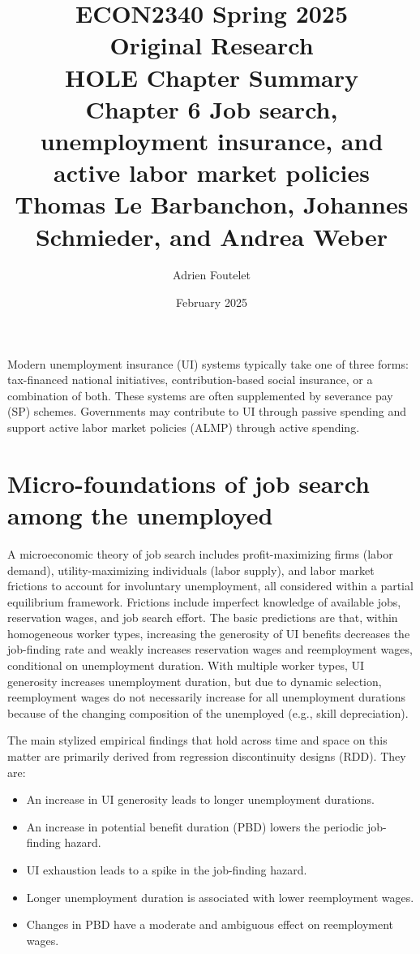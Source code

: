 \documentclass{article}
\title{ECON2340 Spring 2025\\Original Research\\HOLE Chapter Summary\\Chapter 6 Job search, unemployment insurance, and active labor market policies\\Thomas Le Barbanchon, Johannes Schmieder, and Andrea Weber}
\author{Adrien Foutelet}
\date{February 2025}
\begin{document}
\maketitle

Modern unemployment insurance (UI) systems typically take one of three forms: tax-financed national initiatives, contribution-based social insurance, or a combination of both. These systems are often supplemented by severance pay (SP) schemes. Governments may contribute to UI through passive spending and support active labor market policies (ALMP) through active spending.

\section{Micro-foundations of job search among the unemployed}

A microeconomic theory of job search includes profit-maximizing firms (labor demand), utility-maximizing individuals (labor supply), and labor market frictions to account for involuntary unemployment, all considered within a partial equilibrium framework. Frictions include imperfect knowledge of available jobs, reservation wages, and job search effort. The basic predictions are that, within homogeneous worker types, increasing the generosity of UI benefits decreases the job-finding rate and weakly increases reservation wages and reemployment wages, conditional on unemployment duration. With multiple worker types, UI generosity increases unemployment duration, but due to dynamic selection, reemployment wages do not necessarily increase for all unemployment durations because of the changing composition of the unemployed (e.g., skill depreciation).

The main stylized empirical findings that hold across time and space on this matter are primarily derived from regression discontinuity designs (RDD). They are:

\begin{itemize}
    \item An increase in UI generosity leads to longer unemployment durations.
    \item An increase in potential benefit duration (PBD) lowers the periodic job-finding hazard.
    \item UI exhaustion leads to a spike in the job-finding hazard.
    \item Longer unemployment duration is associated with lower reemployment wages.
    \item Changes in PBD have a moderate and ambiguous effect on reemployment wages.
\end{itemize}
\end{document}
